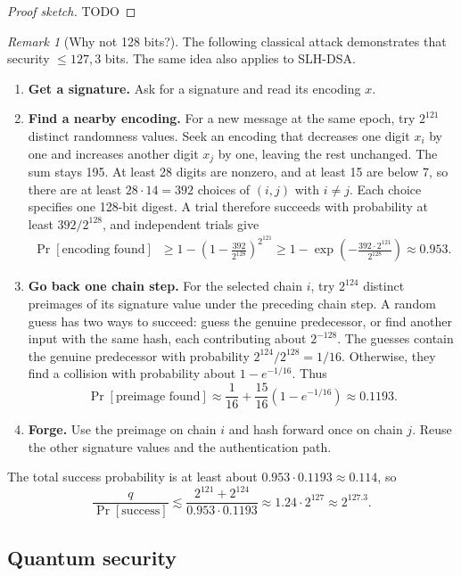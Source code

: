 \documentclass[11pt]{article}
\theoremstyle{definition}
\theoremstyle{plain}
\theoremstyle{remark}
\newtheorem{remark}[definition]{Remark}
\begin{document}
\begin{proof}[Proof sketch]
TODO
\end{proof}

\begin{remark}[Why not 128 bits?]
The following classical attack demonstrates that security $\leq 127,3$ bits. The same idea also applies to SLH-DSA.
\begin{enumerate}[leftmargin=2em]
  \item \textbf{Get a signature.} Ask for a signature and read its encoding $x$.
  \item \textbf{Find a nearby encoding.} For a new message at the same epoch, try $2^{121}$ distinct randomness values. Seek an encoding that decreases one digit $x_i$ by one and increases another digit $x_j$ by one, leaving the rest unchanged. The sum stays 195. At least 28 digits are nonzero, and at least 15 are below 7, so there are at least $28\cdot14=392$ choices of $(i,j)$ with $i\neq j$. Each choice specifies one 128-bit digest. A trial therefore succeeds with probability at least $392/2^{128}$, and independent trials give
  \[
    \begin{aligned}
      \Pr[\text{encoding found}] &\geq 1-\left(1-\frac{392}{2^{128}}\right)^{2^{121}} \geq 1-\exp\!\left(-\frac{392\cdot2^{121}}{2^{128}}\right)
       \approx0.953.
    \end{aligned}
  \]
  \item \textbf{Go back one chain step.} For the selected chain $i$, try $2^{124}$ distinct preimages of its signature value under the preceding chain step. A random guess has two ways to succeed: guess the genuine predecessor, or find another input with the same hash, each contributing about $2^{-128}$. The guesses contain the genuine predecessor with probability $2^{124}/2^{128}=1/16$. Otherwise, they find a collision with probability about $1-e^{-1/16}$. Thus
  \[
    \Pr[\text{preimage found}]\approx\frac{1}{16}+\frac{15}{16}\left(1-e^{-1/16}\right)\approx0.1193.
  \]
  \item \textbf{Forge.} Use the preimage on chain $i$ and hash forward once on chain $j$. Reuse the other signature values and the authentication path.
\end{enumerate}
The total success probability is at least about $0.953\cdot0.1193\approx0.114$, so
\[
  \frac{q}{\Pr[\text{success}]}\lesssim\frac{2^{121}+2^{124}}{0.953\cdot0.1193}\approx1.24\cdot2^{127}\approx2^{127.3}.
\]
\end{remark}

\subsection{Quantum security}
\label{sec:quantum}
\end{document}
